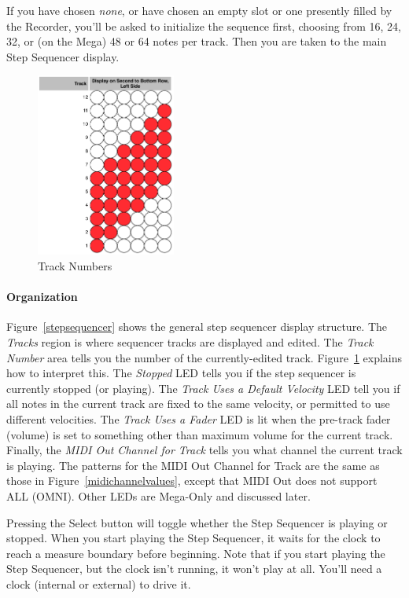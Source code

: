 \documentclass{article}
\begin{document}
If you have chosen {\it none}, or have chosen an empty slot or one presently filled by the Recorder, you'll be asked to initialize the sequence first, choosing from 16, 24, 32, or (on the Mega) 48 or 64 notes per track. Then you are taken to the main Step Sequencer display.  

\begin{figure}
\includegraphics[width=1.8in]{track.pdf}
\vspace{-2em}\caption{\small Track Numbers}
\label{tracknumber}
\end{figure}

\paragraph{Organization} Figure~\ref{stepsequencer} shows the general step sequencer display structure.  The {\it Tracks} region is where sequencer tracks are displayed and edited.  The {\it Track Number} area tells you the number of the currently-edited track.  Figure~\ref{tracknumber} explains how to interpret this.  The {\it Stopped} LED tells you if the step sequencer is currently stopped (or playing).  The {\it Track Uses a Default Velocity} LED tell you if all notes in the current track are fixed to the same velocity, or permitted to use different velocities.  The {\it Track Uses a Fader} LED is lit when the pre-track fader (volume) is set to something other than maximum volume for the current track.   Finally, the {\it MIDI Out Channel for Track} tells you what channel the current track is playing.  The patterns for the MIDI Out Channel for Track are the same as those in Figure~\ref{midichannelvalues}, except that MIDI Out does not support ALL (OMNI).  Other LEDs are Mega-Only and discussed later.

Pressing the Select button will toggle whether the Step Sequencer is playing or stopped.  When you start playing the Step Sequencer, it waits for the clock to reach a measure boundary before beginning.  Note that if you start playing the Step Sequencer, but the clock isn't running, it won't play at all.  You'll need a clock (internal or external) to drive it.
\end{document}
